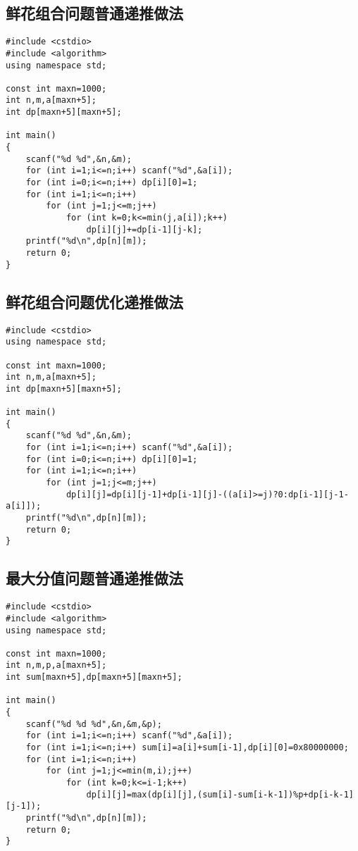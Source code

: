 \documentclass{article}
\begin{document}
\subsection{鲜花组合问题普通递推做法}

\begin{lstlisting}
#include <cstdio>
#include <algorithm>
using namespace std;

const int maxn=1000;
int n,m,a[maxn+5];
int dp[maxn+5][maxn+5];

int main()
{
    scanf("%d %d",&n,&m);
    for (int i=1;i<=n;i++) scanf("%d",&a[i]);
    for (int i=0;i<=n;i++) dp[i][0]=1;
    for (int i=1;i<=n;i++)
        for (int j=1;j<=m;j++)
            for (int k=0;k<=min(j,a[i]);k++)
                dp[i][j]+=dp[i-1][j-k];
    printf("%d\n",dp[n][m]);
    return 0;
}
\end{lstlisting}

\subsection{鲜花组合问题优化递推做法}

\begin{lstlisting}
#include <cstdio>
using namespace std;

const int maxn=1000;
int n,m,a[maxn+5];
int dp[maxn+5][maxn+5];

int main()
{
    scanf("%d %d",&n,&m);
    for (int i=1;i<=n;i++) scanf("%d",&a[i]);
    for (int i=0;i<=n;i++) dp[i][0]=1;
    for (int i=1;i<=n;i++)
        for (int j=1;j<=m;j++)
            dp[i][j]=dp[i][j-1]+dp[i-1][j]-((a[i]>=j)?0:dp[i-1][j-1-a[i]]);
    printf("%d\n",dp[n][m]);
    return 0;
}
\end{lstlisting}

\subsection{最大分值问题普通递推做法}

\begin{lstlisting}
#include <cstdio>
#include <algorithm>
using namespace std;

const int maxn=1000;
int n,m,p,a[maxn+5];
int sum[maxn+5],dp[maxn+5][maxn+5];

int main()
{
    scanf("%d %d %d",&n,&m,&p);
    for (int i=1;i<=n;i++) scanf("%d",&a[i]);
    for (int i=1;i<=n;i++) sum[i]=a[i]+sum[i-1],dp[i][0]=0x80000000;
    for (int i=1;i<=n;i++)
        for (int j=1;j<=min(m,i);j++)
            for (int k=0;k<=i-1;k++)
                dp[i][j]=max(dp[i][j],(sum[i]-sum[i-k-1])%p+dp[i-k-1][j-1]);
    printf("%d\n",dp[n][m]);
    return 0;
}
\end{lstlisting}
\end{document}
